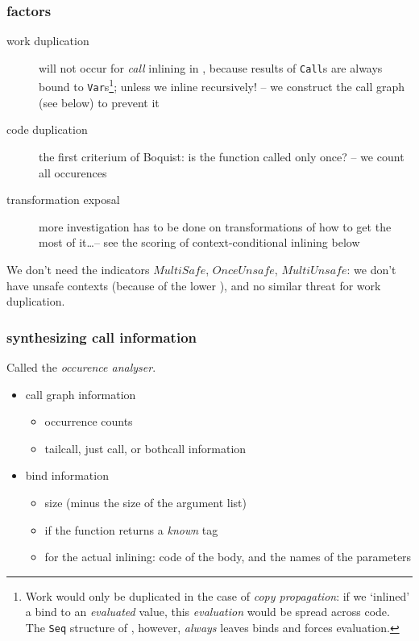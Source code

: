 \documentclass{article}
\begin{document}
\subsubsection{factors}
\begin{description}
\item[work duplication] will not occur for \emph{call} inlining in \grin, because results of \texttt{Call}s are always bound to \texttt{Var}s\footnote{Work would only be duplicated in the case of \emph{copy propagation}: if we `inlined' a bind to an \emph{evaluated} value, this \emph{evaluation} would be spread across code. The \texttt{Seq} structure of \grin, however, \emph{always} leaves binds and forces evaluation.}; unless we inline recursively! -- we construct the call graph (see below) to prevent it
\item[code duplication] the first criterium of Boquist: is the function called only once? -- we count all occurences
\item[transformation exposal] more investigation has to be done on \grin transformations of how to get the most of it\ldots -- see the scoring of context-conditional inlining below
\end{description}

We don't need the indicators $MultiSafe$, $OnceUnsafe$, $MultiUnsafe$: we don't have unsafe contexts (because of the lower \grin), and no similar threat for work duplication.

\subsubsection{synthesizing call information}
Called the \emph{occurence analyser}.

\begin{itemize}
\item call graph information
\begin{itemize}
\item occurrence counts
\item tailcall, just call, or bothcall information
\end{itemize}
\item bind information
\begin{itemize}
\item size (minus the size of the argument list)
\item if the function returns a \emph{known} tag
\item for the actual inlining: code of the body, and the names of the parameters
\end{itemize}
\end{itemize}
\end{document}
